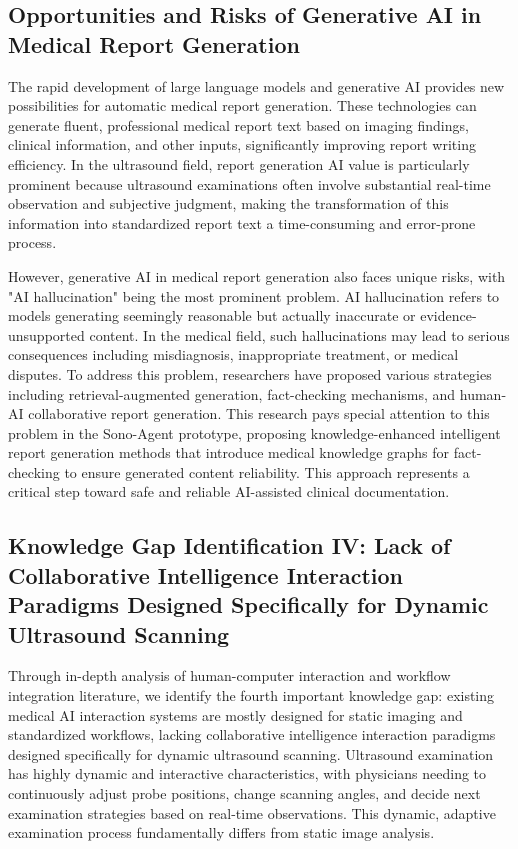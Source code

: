 \subsection{Opportunities and Risks of Generative AI in Medical Report Generation}

The rapid development of large language models and generative AI provides new possibilities for automatic medical report generation. These technologies can generate fluent, professional medical report text based on imaging findings, clinical information, and other inputs, significantly improving report writing efficiency. In the ultrasound field, report generation AI value is particularly prominent because ultrasound examinations often involve substantial real-time observation and subjective judgment, making the transformation of this information into standardized report text a time-consuming and error-prone process.

However, generative AI in medical report generation also faces unique risks, with "AI hallucination" being the most prominent problem. AI hallucination refers to models generating seemingly reasonable but actually inaccurate or evidence-unsupported content. In the medical field, such hallucinations may lead to serious consequences including misdiagnosis, inappropriate treatment, or medical disputes. To address this problem, researchers have proposed various strategies including retrieval-augmented generation, fact-checking mechanisms, and human-AI collaborative report generation. This research pays special attention to this problem in the Sono-Agent prototype, proposing knowledge-enhanced intelligent report generation methods that introduce medical knowledge graphs for fact-checking to ensure generated content reliability. This approach represents a critical step toward safe and reliable AI-assisted clinical documentation.

\subsection{Knowledge Gap Identification IV: Lack of Collaborative Intelligence Interaction Paradigms Designed Specifically for Dynamic Ultrasound Scanning}

Through in-depth analysis of human-computer interaction and workflow integration literature, we identify the fourth important knowledge gap: existing medical AI interaction systems are mostly designed for static imaging and standardized workflows, lacking collaborative intelligence interaction paradigms designed specifically for dynamic ultrasound scanning. Ultrasound examination has highly dynamic and interactive characteristics, with physicians needing to continuously adjust probe positions, change scanning angles, and decide next examination strategies based on real-time observations. This dynamic, adaptive examination process fundamentally differs from static image analysis.

